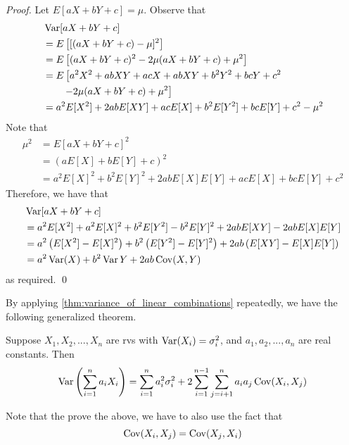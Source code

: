 \documentclass[notoc,notitlepage]{tufte-book}
\begin{document}
\begin{proof}
  Let $E[ aX + bY + c ] = \mu$. Observe that
  \begin{align*}
    &\operatorname{Var}[ aX + bY + c ] \\
    &= E \left[ [ ( aX + bY + c ) - \mu ]^2 \right] \\
    &= E \left[ (aX + bY + c)^2 - 2\mu (aX + bY + c) + \mu^2 \right] \\
    &= E \left[ a^2X^2 + abXY + acX + abXY + b^2 Y^2 + bcY + c^2 \right. \\
    & \qquad \left. - 2\mu(aX + bY+c) + \mu^2 \right] \\
    &= a^2 E[X^2] + 2ab E[XY] + ac E[X] + b^2 E[Y^2] + bc E[Y] + c^2 - \mu^2
  \end{align*}
  Note that
  \begin{align*}
    \mu^2 &= E \left[ aX + bY + c \right]^2 \\
      &= \left( aE[X] + bE[Y] + c \right)^2 \\
      &= a^2 E[X]^2 + b^2 E[Y]^2 + 2abE[X]E[Y] + acE[X] + bcE[Y] + c^2
  \end{align*}
  Therefore, we have that
  \begin{align*}
    &\operatorname{Var}[aX + bY + c] \\
    &= a^2 E[X^2] + a^2 E[X]^2 + b^2 E[Y^2] - b^2 E[Y]^2 + 2ab E[XY] - 2ab E[X]E[Y] \\
    &= a^2 \left( E[X^2] - E[X]^2 \right) + b^2 \left( E[Y^2] - E[Y]^2 \right) + 2ab \left( E[XY] - E[X]E[Y] \right) \\
    &= a^2 \operatorname{Var}(X) + b^2 \operatorname{Var}{Y} + 2ab \operatorname{Cov}(X, Y)
  \end{align*}
  as required. \qed
\end{proof}

By applying \cref{thm:variance_of_linear_combinations} repeatedly, we have the following generalized theorem.

\begin{thm}
\label{thm:generalized_variance_of_linear_combinations}
  Suppose $X_1, X_2, ..., X_n$ are rvs with $\operatorname{Var}(X_i) = \sigma_i^2$, and $a_1, a_2, ..., a_n$ are real constants. Then
  \begin{equation*}
    \operatorname{Var} \left( \sum_{i=1}^{n} a_i X_i \right) = \sum_{i = 1}^{n} a_i^2 \sigma_i^2 + 2 \sum_{i=1}^{n-1} \sum^{n}_{j = i + 1} a_i a_j \operatorname{Cov}(X_i, X_j)
  \end{equation*}
\end{thm}

Note that the prove the above, we have to also use the fact that
\begin{equation*}
  \operatorname{Cov}(X_i, X_j) = \operatorname{Cov}(X_j, X_i)
\end{equation*}
\end{document}
